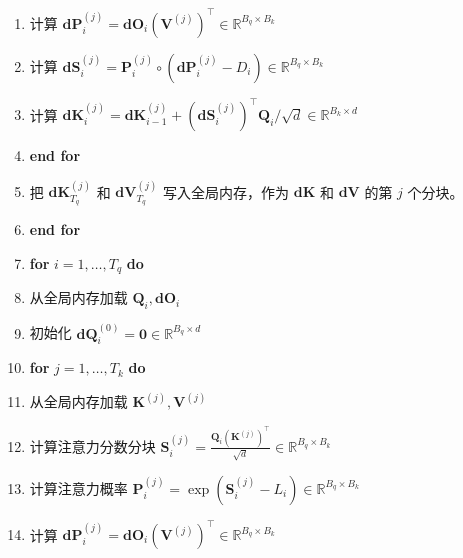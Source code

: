 \begin{enumerate}[label=\arabic*., leftmargin=2.2em, itemsep=1pt, parsep=0pt]
  \item \hspace*{3.2em}计算 $\boldsymbol{dP}_i^{(j)} = \boldsymbol{dO}_i \left(\boldsymbol{V}^{(j)}\right)^{\top} \in \mathbb{R}^{B_q \times B_k}$
  \item \hspace*{3.2em}计算 $\boldsymbol{dS}_i^{(j)} = \boldsymbol{P}_i^{(j)} \circ \left(\boldsymbol{dP}_i^{(j)} - D_i\right) \in \mathbb{R}^{B_q \times B_k}$
  \item \hspace*{3.2em}计算 $\boldsymbol{dK}_i^{(j)} = \boldsymbol{dK}_{i-1}^{(j)} + \left(\boldsymbol{dS}_i^{(j)}\right)^{\top} \boldsymbol{Q}_i / \sqrt{d} \in \mathbb{R}^{B_k \times d}$
  \item \hspace*{1.6em}\textbf{end for}
  \item \hspace*{1.6em}把 $\boldsymbol{dK}_{T_q}^{(j)}$ 和 $\boldsymbol{dV}_{T_q}^{(j)}$ 写入全局内存，作为 $\boldsymbol{dK}$ 和 $\boldsymbol{dV}$ 的第 $j$ 个分块。
  \item \textbf{end for}
  \item \textbf{for} $i = 1, \dots, T_q$ \textbf{do}
  \item \hspace*{1.6em}从全局内存加载 $\boldsymbol{Q}_i, \boldsymbol{dO}_i$
  \item \hspace*{1.6em}初始化 $\boldsymbol{dQ}_i^{(0)} = \boldsymbol{0} \in \mathbb{R}^{B_q \times d}$
  \item \hspace*{1.6em}\textbf{for} $j = 1, \dots, T_k$ \textbf{do}
  \item \hspace*{3.2em}从全局内存加载 $\boldsymbol{K}^{(j)}, \boldsymbol{V}^{(j)}$
  \item \hspace*{3.2em}计算注意力分数分块 $\boldsymbol{S}_i^{(j)} = \frac{\boldsymbol{Q}_i (\boldsymbol{K}^{(j)})^{\top}}{\sqrt{d}} \in \mathbb{R}^{B_q \times B_k}$
  \item \hspace*{3.2em}计算注意力概率 $\boldsymbol{P}_i^{(j)} = \exp\left(\boldsymbol{S}_i^{(j)} - L_i\right) \in \mathbb{R}^{B_q \times B_k}$
  \item \hspace*{3.2em}计算 $\boldsymbol{dP}_i^{(j)} = \boldsymbol{dO}_i \left(\boldsymbol{V}^{(j)}\right)^{\top} \in \mathbb{R}^{B_q \times B_k}$

\end{enumerate}
